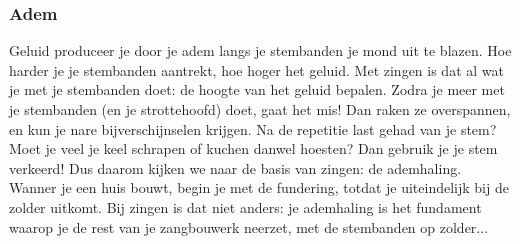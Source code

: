 \subsubsection*{Adem}
Geluid produceer je door je adem langs je stembanden je mond uit te blazen. Hoe harder je je stembanden aantrekt, hoe hoger het geluid. Met zingen is dat al wat je met je stembanden doet: de hoogte van het geluid bepalen. Zodra je meer met je stembanden (en je strottehoofd) doet, gaat het mis! Dan raken ze overspannen, en kun je nare bijverschijnselen krijgen. Na de repetitie last gehad van je stem? Moet je veel je keel schrapen of kuchen danwel hoesten? Dan gebruik je je stem verkeerd! Dus daarom kijken we naar de basis van zingen: de ademhaling. Wanner je een huis bouwt, begin je met de fundering, totdat je uiteindelijk bij de zolder uitkomt. Bij zingen is dat niet anders: je ademhaling is het fundament waarop je de rest van je zangbouwerk neerzet, met de stembanden op zolder...

